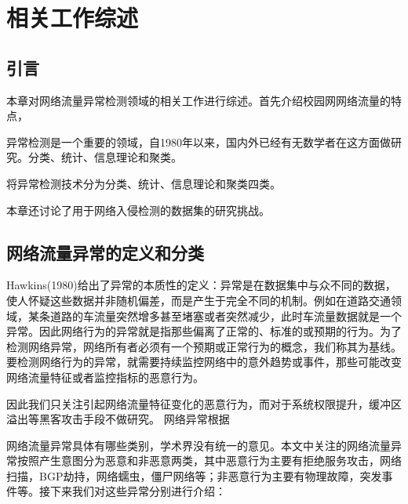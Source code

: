 
\chapter{相关工作综述}

\section{引言}

本章对网络流量异常检测领域的相关工作进行综述。首先介绍校园网网络流量的特点，


异常检测是一个重要的领域，自1980年以来，国内外已经有无数学者在这方面做研究。分类、统计、信息理论和聚类。

\citet{ahmed2016survey}将异常检测技术分为分类、统计、信息理论和聚类四类。


本章还讨论了用于网络入侵检测的数据集的研究挑战。



\section{网络流量异常的定义和分类}
Hawkins(1980)给出了异常的本质性的定义\cite{hawkins1980identification}：异常是在数据集中与众不同的数据，使人怀疑这些数据并非随机偏差，而是产生于完全不同的机制。例如在道路交通领域，某条道路的车流量突然增多甚至堵塞或者突然减少，此时车流量数据就是一个异常。因此网络行为的异常就是指那些偏离了正常的、标准的或预期的行为。为了检测网络异常，网络所有者必须有一个预期或正常行为的概念，我们称其为基线。要检测网络行为的异常，就需要持续监控网络中的意外趋势或事件，那些可能改变网络流量特征或者监控指标的恶意行为。


因此我们只关注引起网络流量特征变化的恶意行为，而对于系统权限提升，缓冲区溢出等黑客攻击手段不做研究。
网络异常根据

网络流量异常具体有哪些类别，学术界没有统一的意见。本文中关注的网络流量异常按照产生意图分为恶意和非恶意两类，其中恶意行为主要有拒绝服务攻击，网络扫描，BGP劫持，网络蠕虫，僵尸网络等；非恶意行为主要有物理故障，突发事件等。接下来我们对这些异常分别进行介绍：


